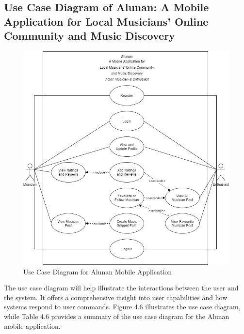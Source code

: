 \subsection{Use Case Diagram of Alunan: A Mobile Application for Local Musicians’ Online Community and Music Discovery}
\begin{figure}[h]
    \centering
    \includegraphics[width=1.0\linewidth]{mainmatter/images/usecasemain.png}
    \caption{Use Case Diagram for Alunan Mobile Application}
    \label{fig:myfig45}
\end{figure}
The use case diagram will help illustrate the interactions between the user and the system. It offers a comprehensive insight into user capabilities and how systems respond to user commands. Figure 4.6 illustrates the use case diagram, while Table 4.6 provides a summary of the use case diagram for the Alunan mobile application.
\pagebreak

